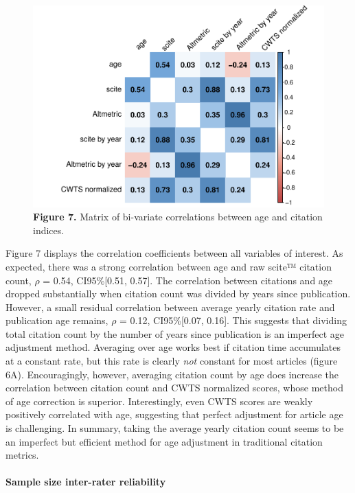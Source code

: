 \documentclass[
  english,
  man,floatsintext]{apa6}
\let\oldparagraph\paragraph
\renewcommand{\paragraph}[1]{\oldparagraph{#1}\mbox{}}
\begin{document}
\begin{figure}
\centering
\includegraphics{RVcn_feasibility_in_social_neuroscience_files/figure-latex/fig7-1.pdf}
\caption{\label{fig:fig7}\textbf{Figure 7.} Matrix of bi-variate correlations between age and citation indices.}
\end{figure}

Figure 7 displays the correlation coefficients between all variables of interest. As expected, there was a strong correlation between age and raw scite™ citation count, \(\rho\) = 0.54, CI95\%{[}0.51, 0.57{]}. The correlation between citations and age dropped substantially when citation count was divided by years since publication. However, a small residual correlation between average yearly citation rate and publication age remains, \(\rho\) = 0.12, CI95\%{[}0.07, 0.16{]}. This suggests that dividing total citation count by the number of years since publication is an imperfect age adjustment method. Averaging over age works best if citation time accumulates at a constant rate, but this rate is clearly \emph{not} constant for most articles (figure 6A). Encouragingly, however, averaging citation count by age does increase the correlation between citation count and CWTS normalized scores, whose method of age correction is superior. Interestingly, even CWTS scores are weakly positively correlated with age, suggesting that perfect adjustment for article age is challenging. In summary, taking the average yearly citation count seems to be an imperfect but efficient method for age adjustment in traditional citation metrics.

\hypertarget{sample-size-inter-rater-reliability}{%
\paragraph{Sample size inter-rater reliability}\label{sample-size-inter-rater-reliability}}
\end{document}
